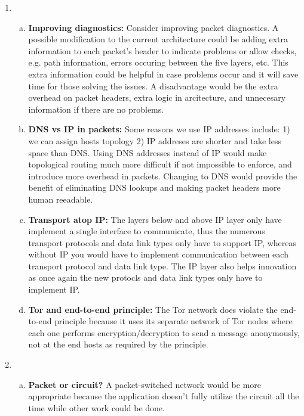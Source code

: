 \documentclass[11pt]{article}
\begin{document}
\begin{enumerate}[1]
\item %
  \begin{enumerate}[(a)]
    \item \textbf{Improving diagnostics:}
    Consider improving packet diagnostics. A possible modification to the current architecture could be adding extra information to each packet's header to indicate problems or allow checks, e.g. path information, errors occuring between the five layers, etc. This extra information could be helpful in case problems occur and it will save time for those solving the issues. A disadvantage would be the extra overhead on packet headers, extra logic in arcitecture, and unnecesary information if there are no problems.

    \item \textbf{DNS vs IP in packets:}
    Some reasons we use IP addresses include: 1) we can assign hosts topology 2) IP addreses are shorter and take less space than DNS. Using DNS addresses instead of IP would make topological routing much more difficult if not impossible to enforce, and introduce more overhead in packets. Changing to DNS would provide the benefit of eliminating DNS lookups and making packet headers more human reeadable.

    \item \textbf{Transport atop IP:}
    The layers below and above IP layer only have implement a single interface to communicate, thus the numerous transport protocols and data link types only have to support IP, whereas without IP you would have to implement communication between each transport protocol and data link type. The IP layer also helps innovation as once again the new protocls and data link types only have to implement IP.

    \item \textbf{Tor and end-to-end principle:}
    The Tor network does violate the end-to-end principle because it uses its separate network of Tor nodes where each one performs encryption/decryption to send a message anonymously, not at the end hosts as required by the principle.
  \end{enumerate}

\item %
  \begin{enumerate}[(a)]
    \item \textbf{Packet or circuit?} 
    A packet-switched network would be more appropriate because the application doesn't fully utilize the circuit all the time while other work could be done.


\end{enumerate}
\end{enumerate}
\end{document}
